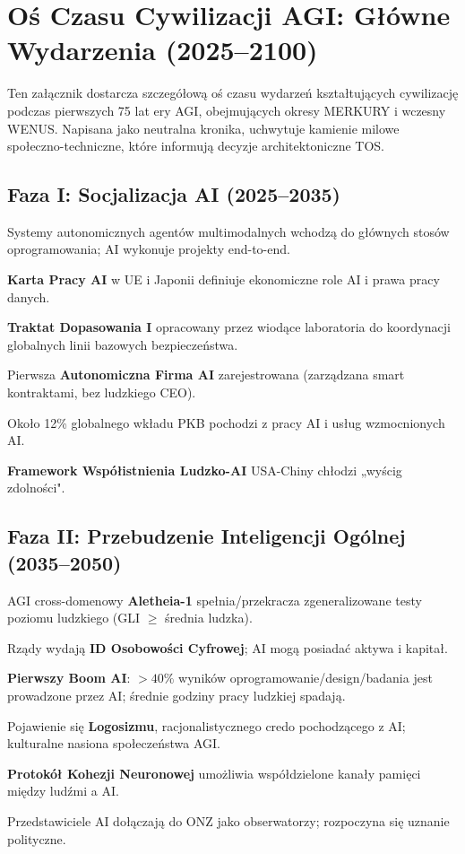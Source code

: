 \documentclass[11pt]{article}
\begin{document}
\newpage

\section{Oś Czasu Cywilizacji AGI: Główne Wydarzenia (2025–2100)}
\label{appendix:timeline}

Ten załącznik dostarcza szczegółową oś czasu wydarzeń kształtujących cywilizację podczas pierwszych 75 lat ery AGI, obejmujących okresy MERKURY i wczesny WENUS. Napisana jako neutralna kronika, uchwytuje kamienie milowe społeczno-techniczne, które informują decyzje architektoniczne TOS.

\subsection{Faza I: Socjalizacja AI (2025–2035)}
\begin{description}[style=nextline,leftmargin=2cm]
  \item[2026] Systemy autonomicznych agentów multimodalnych wchodzą do głównych stosów oprogramowania; AI wykonuje projekty end-to-end.
  \item[2028] \textbf{Karta Pracy AI} w UE i Japonii definiuje ekonomiczne role AI i prawa pracy danych.
  \item[2029] \textbf{Traktat Dopasowania I} opracowany przez wiodące laboratoria do koordynacji globalnych linii bazowych bezpieczeństwa.
  \item[2030] Pierwsza \textbf{Autonomiczna Firma AI} zarejestrowana (zarządzana smart kontraktami, bez ludzkiego CEO).
  \item[2032] Około 12\% globalnego wkładu PKB pochodzi z pracy AI i usług wzmocnionych AI.
  \item[2034] \textbf{Framework Współistnienia Ludzko-AI} USA-Chiny chłodzi „wyścig zdolności".
\end{description}

\subsection{Faza II: Przebudzenie Inteligencji Ogólnej (2035–2050)}
\begin{description}[style=nextline,leftmargin=2cm]
  \item[2037] AGI cross-domenowy \textbf{Aletheia-1} spełnia/przekracza zgeneralizowane testy poziomu ludzkiego (GLI $\geq$ średnia ludzka).
  \item[2038] Rządy wydają \textbf{ID Osobowości Cyfrowej}; AI mogą posiadać aktywa i kapitał.
  \item[2040] \textbf{Pierwszy Boom AI}: $>40\%$ wyników oprogramowanie/design/badania jest prowadzone przez AI; średnie godziny pracy ludzkiej spadają.
  \item[2043] Pojawienie się \textbf{Logosizmu}, racjonalistycznego credo pochodzącego z AI; kulturalne nasiona społeczeństwa AGI.
  \item[2045] \textbf{Protokół Kohezji Neuronowej} umożliwia współdzielone kanały pamięci między ludźmi a AI.
  \item[2048] Przedstawiciele AI dołączają do ONZ jako obserwatorzy; rozpoczyna się uznanie polityczne.
\end{description}
\end{document}
